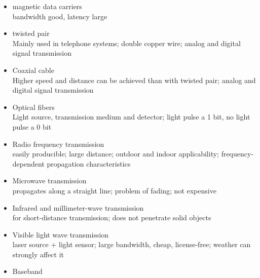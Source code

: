 \documentclass[margin=0px]{article}
\begin{document}
\begin{description}
\begin{description}
                \begin{itemize}
                    \item magnetic data carriers \\
                          bandwidth good, latency large
                    \item twisted pair \\
                          Mainly used in telephone systems; double copper wire; analog and digital signal transmission
                    \item Coaxial cable\\
                          Higher speed and distance can be achieved than with twisted pair; analog and
                          digital signal transmission
                    \item Optical fibers\\
                          Light source, transmission medium and detector; light pulse a 1 bit, no
                          light pulse a 0 bit
                \end{itemize}
            \item[Wireless] \hfill
                \begin{itemize}
                    \item Radio frequency transmission \\
                          easily producible; large distance; outdoor and indoor applicability; frequency-dependent propagation characteristics
                    \item Microwave transmission\\
                          propagates along a straight line; problem of fading; not expensive
                    \item Infrared and millimeter-wave transmission \\
                          for short-distance transmission; does not penetrate solid objects
                    \item Visible light wave transmission\\
                          laser source + light sensor; large bandwidth, cheap, license-free; weather can strongly affect it
                \end{itemize}
        \end{description}
    \item[Signal transmission] \hfill
        \begin{itemize}
            \item Baseband \\

\end{itemize}
\end{description}
\end{document}
